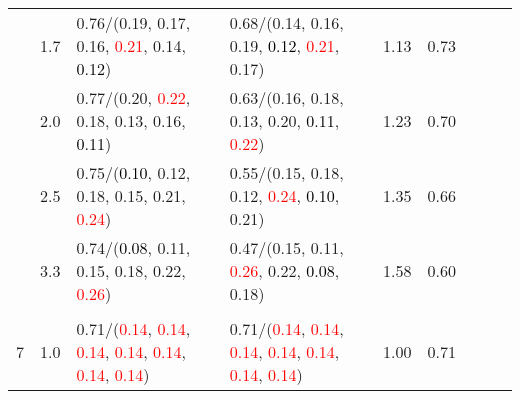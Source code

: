 \documentclass[10pt,a4paper]{report}
\begin{document}
\begin{table}[!htbp]
\begin{center}
{\begin{tabular}{ccllccccc}
				  & 1.7                               & 0.76/(0.19, 0.17, 0.16, \textcolor{red}{0.21}, 0.14, \textcolor{black}{0.12})                                                                                                                 & 0.68/(0.14, 0.16, 0.19, \textcolor{black}{0.12}, \textcolor{red}{0.21}, 0.17)                                                                                                                 & 1.13             & 0.73                     \\
				  & 2.0                               & 0.77/(0.20, \textcolor{red}{0.22}, 0.18, 0.13, 0.16, \textcolor{black}{0.11})                                                                                                                 & 0.63/(0.16, 0.18, 0.13, 0.20, \textcolor{black}{0.11}, \textcolor{red}{0.22})                                                                                                                 & 1.23             & 0.70                     \\
				  & 2.5                               & 0.75/(\textcolor{black}{0.10}, 0.12, 0.18, 0.15, 0.21, \textcolor{red}{0.24})                                                                                                                 & 0.55/(0.15, 0.18, 0.12, \textcolor{red}{0.24}, \textcolor{black}{0.10}, 0.21)                                                                                                                 & 1.35             & 0.66                     \\
				  & 3.3                               & 0.74/(\textcolor{black}{0.08}, 0.11, 0.15, 0.18, 0.22, \textcolor{red}{0.26})                                                                                                                 & 0.47/(0.15, 0.11, \textcolor{red}{0.26}, 0.22, \textcolor{black}{0.08}, 0.18)                                                                                                                 & 1.58             & 0.60                     \\
				  &                                   &                                                                                                                                                                                               &                                                                                                                                                                                               &                                             \\
				7 & 1.0                               & 0.71/(\textcolor{red}{0.14}, \textcolor{red}{0.14}, \textcolor{red}{0.14}, \textcolor{red}{0.14}, \textcolor{red}{0.14}, \textcolor{red}{0.14}, \textcolor{red}{0.14})                        & 0.71/(\textcolor{red}{0.14}, \textcolor{red}{0.14}, \textcolor{red}{0.14}, \textcolor{red}{0.14}, \textcolor{red}{0.14}, \textcolor{red}{0.14}, \textcolor{red}{0.14})                        & 1.00             & 0.71                     \\

\end{tabular}}
\end{center}
\end{table}
\end{document}

